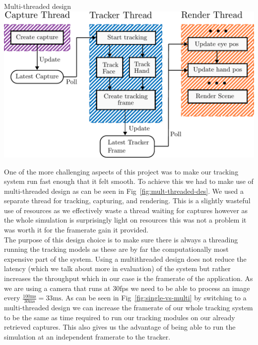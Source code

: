\begin{figureBox}[label={fig:mult-threaded-des}, width=0.8\linewidth]{Multi-threaded design}
    \includegraphics[width = 1.0\linewidth]{./implementation/figures/multi-thread-design.pdf}
\end{figureBox}

One of the more challenging aspects of this project was to make our tracking system run fast enough that it felt smooth. To achieve this we had to make use of multi-threaded design as can be seen in Fig~\ref{fig:mult-threaded-des}. We used a separate thread for tracking, capturing, and rendering. This is a slightly wasteful use of resources as we effectively waste a thread waiting for captures however as the whole simulation is surprisingly light on resources this was not a problem it was worth it for the framerate gain it provided. \\

The purpose of this design choice is to make sure there is always a threading running the tracking models as these are by far the computationally most expensive part of the system. Using a multithreaded design does not reduce the latency (which we talk about more in evaluation) of the system but rather increases the throughput which in our case is the framerate of the application. As we are using a camera that runs at 30fps we need to be able to process an image every $\frac{100\text{ms}}{30\text{ms}} = 33 \text{ms} $. As can be seen in Fig~\ref{fig:single-vs-multi} by switching to a multi-threaded design we can increase the framerate of our whole tracking system to be the same as time required to run our tracking modules on our already retrieved captures. This also gives us the advantage of being able to run the simulation at an independent framerate to the tracker. \\

